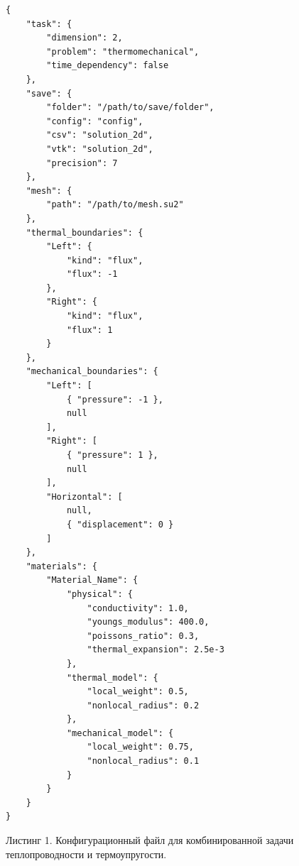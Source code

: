 %
\begin{verbatim}
{
    "task": {
        "dimension": 2,
        "problem": "thermomechanical",
        "time_dependency": false
    },
    "save": {
        "folder": "/path/to/save/folder",
        "config": "config",
        "csv": "solution_2d",
        "vtk": "solution_2d",
        "precision": 7
    },
    "mesh": {
        "path": "/path/to/mesh.su2"
    },
    "thermal_boundaries": {
        "Left": {
            "kind": "flux",
            "flux": -1
        },
        "Right": {
            "kind": "flux",
            "flux": 1
        }
    },
    "mechanical_boundaries": {
        "Left": [
            { "pressure": -1 },
            null
        ],
        "Right": [
            { "pressure": 1 },
            null
        ],
        "Horizontal": [
            null,
            { "displacement": 0 }
        ]
    },
    "materials": {
        "Material_Name": {
            "physical": {
                "conductivity": 1.0,
                "youngs_modulus": 400.0,
                "poissons_ratio": 0.3,
                "thermal_expansion": 2.5e-3
            },
            "thermal_model": {
                "local_weight": 0.5,
                "nonlocal_radius": 0.2
            },
            "mechanical_model": {
                "local_weight": 0.75,
                "nonlocal_radius": 0.1
            }
        }
    }
}
\end{verbatim}

Листинг 1. Конфигурационный файл для комбинированной задачи теплопроводности и термоупругости.

